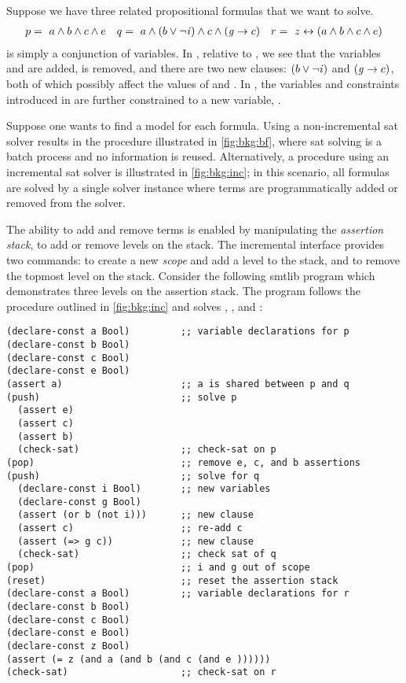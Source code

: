 \label{section:background-incremental}
%
%

%
%
Suppose we have three related propositional formulas that we want to solve.
%
\begin{align*}
  p =\ a \wedge b \wedge c \wedge e && q=\ a \wedge (b \vee \neg \mathit{i}{}) \wedge c \wedge (\mathit{g}{} \rightarrow c) && r =~z \leftrightarrow (a \wedge b \wedge c \wedge e)
\end{align*}
%
\pV{} is simply a conjunction of variables. In \qV{}, relative to \pV{}, we see
that the variables \iV{} and \gV{} are added, \eV{} is removed, and there are
two new clauses: $(b \vee \neg \mathit{i}{})$ and $(\mathit{g}{} \rightarrow c)$, both of
which possibly affect the values of \bV{} and \cV{}. In \rV{}, the variables and
constraints introduced in \pV{} are further constrained to a new variable,
\zV{}.

Suppose one wants to find a model for each formula. Using a non-incremental
\ac{sat} solver results in the procedure illustrated in \autoref{fig:bkg:bf},
where \ac{sat} solving is a batch process and no information is reused.
Alternatively, a procedure using an incremental \ac{sat} solver is illustrated
in \autoref{fig:bkg:inc}; in this scenario, all formulas are solved by a single
solver instance where terms are programmatically added or removed from the
solver.

The ability to add and remove terms is enabled by manipulating the
\textit{assertion stack}, to add or remove levels on the stack. The incremental
interface provides two commands:  to create a new \emph{scope} and add
a level to the stack, and  to remove the topmost level on the stack.
Consider the following \acl{smtlib} program which demonstrates three levels on
the assertion stack. The program follows the procedure outlined in
\autoref{fig:bkg:inc} and solves \pV, \qV{}, and \rV{}:

\begin{lstlisting}[columns=flexible,keepspaces=true,language=SMTLIB]
(declare-const a Bool)         ;; variable declarations for p
(declare-const b Bool)
(declare-const c Bool)
(declare-const e Bool)
(assert a)                     ;; a is shared between p and q
(push)                         ;; solve p
  (assert e)
  (assert c)
  (assert b)
  (check-sat)                  ;; check-sat on p
(pop)                          ;; remove e, c, and b assertions
(push)                         ;; solve for q
  (declare-const i Bool)       ;; new variables
  (declare-const g Bool)
  (assert (or b (not i)))      ;; new clause
  (assert c)                   ;; re-add c
  (assert (=> g c))            ;; new clause
  (check-sat)                  ;; check sat of q
(pop)                          ;; i and g out of scope
(reset)                        ;; reset the assertion stack
(declare-const a Bool)         ;; variable declarations for r
(declare-const b Bool)
(declare-const c Bool)
(declare-const e Bool)
(declare-const z Bool)
(assert (= z (and a (and b (and c (and e ))))))
(check-sat)                    ;; check-sat on r
\end{lstlisting}

